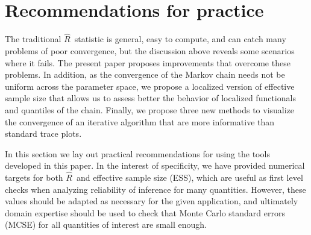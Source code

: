 \documentclass[american,]{article}
\newcommand{\Rhat}{$\widehat{R}$}
\newcommand{\sRhat}{split-$\widehat{R}$}
\theoremstyle{definition}
\begin{document}


\section{Recommendations for practice}


The traditional \Rhat\ statistic is general, easy to compute, and can
catch many problems of poor convergence, but the discussion above
reveals some scenarios where it fails. The present paper proposes
improvements that overcome these problems.
%
In addition, as the convergence
of the Markov chain needs not be uniform across the parameter space, we
propose a localized version of effective sample size
that allows us to assess better the behavior of localized 
functionals and quantiles of the chain.
Finally, we propose three new methods to visualize the 
convergence of an iterative algorithm that are more informative than standard 
trace plots.

In this section we lay out practical recommendations for using the tools 
developed in this paper. In the interest of specificity, we have 
provided numerical targets for both \Rhat\ and effective sample size (ESS),
which are useful as first level checks when analyzing reliability of inference for
many quantities. However, these values should be adapted as necessary for the given
application, and ultimately domain expertise should be used to check that Monte Carlo
standard errors (MCSE) for all quantities of interest are small enough.
\end{document}
